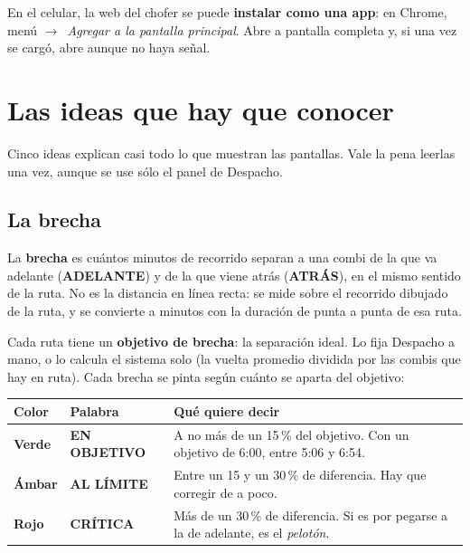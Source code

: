 \documentclass[11pt,a4paper,oneside]{book}
\newcommand{\rotulo}[1]{{\footnotesize\bfseries\color{tinta2}\MakeUppercase{#1}}}
\newcommand{\enverde}[1]{{\color{verde}\bfseries #1}}
\newcommand{\enambar}[1]{{\color{ambar}\bfseries #1}}
\newcommand{\enrojo}[1]{{\color{rojo}\bfseries #1}}
\newcommand{\flecha}{$\rightarrow$\ }
\begin{document}
\begin{consejo}
En el celular, la web del chofer se puede \textbf{instalar como una app}: en
Chrome, menú \flecha \emph{Agregar a la pantalla principal}. Abre a pantalla
completa y, si una vez se cargó, abre aunque no haya señal.
\end{consejo}

\chapter{Las ideas que hay que conocer}
\label{cap:ideas}

Cinco ideas explican casi todo lo que muestran las pantallas. Vale la pena
leerlas una vez, aunque se use sólo el panel de Despacho.

\section{La brecha}

La \textbf{brecha} es cuántos minutos de recorrido separan a una combi de la
que va adelante (\rotulo{adelante}) y de la que viene atrás (\rotulo{atrás}),
en el mismo sentido de la ruta. No es la distancia en línea recta: se mide
sobre el recorrido dibujado de la ruta, y se convierte a minutos con la
duración de punta a punta de esa ruta.

Cada ruta tiene un \textbf{objetivo de brecha}: la separación ideal. Lo fija
Despacho a mano, o lo calcula el sistema solo (la vuelta promedio dividida por
las combis que hay en ruta). Cada brecha se pinta según cuánto se aparta del
objetivo:

\begin{center}
\renewcommand{\arraystretch}{1.35}
\begin{tabularx}{\textwidth}{l l X}
\toprule
\rowcolor{fondo} Color & Palabra & Qué quiere decir \\
\midrule
\enverde{Verde} & \rotulo{en objetivo} & A no más de un 15\,\% del objetivo. Con un objetivo de 6:00, entre 5:06 y 6:54. \\
\enambar{Ámbar} & \rotulo{al límite} & Entre un 15 y un 30\,\% de diferencia. Hay que corregir de a poco. \\
\enrojo{Rojo} & \rotulo{crítica} & Más de un 30\,\% de diferencia. Si es por pegarse a la de adelante, es el \emph{pelotón}. \\
\bottomrule
\end{tabularx}
\end{center}
\end{document}
